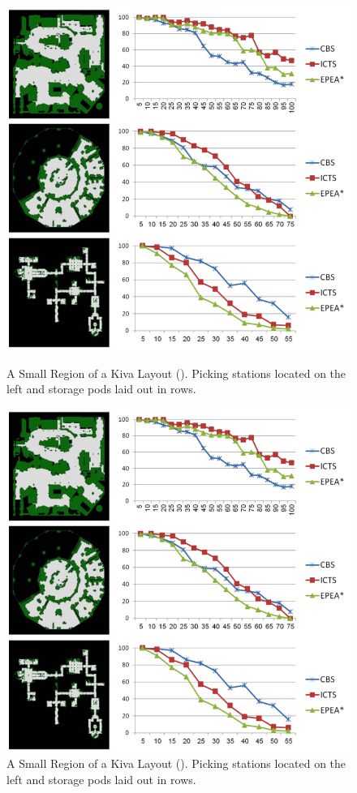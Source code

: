 \documentclass[a4paper,11pt]{article}
\begin{document}
\begin{figure}[!htb]
	\centering \tiny
	\begin{minipage}{0.4\textwidth}
	\centering
	\includegraphics[width=\linewidth]{graphics/cbsresults1}
	\caption{A Small Region of a Kiva Layout (\cite{sharon2015conflict}). Picking stations located on the left and storage pods laid out in rows.}
	\label{cbsresults1}
	\end{minipage}
	\begin{minipage}{0.4\linewidth}
		\centering
	\includegraphics[width=\linewidth]{graphics/cbsresults1}
	\caption{A Small Region of a Kiva Layout (\cite{sharon2015conflict}). Picking stations located on the left and storage pods laid out in rows.}
	\label{cbsresults2}
	\end{minipage}
\end{figure}
\end{document}
